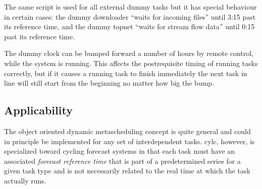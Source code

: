 The same script is used for all external dummy tasks but it has special
behaviour in certain cases: the dummy downloader ``waits for incoming
files'' until 3:15 past its reference time, and the dummy topnet ``waits
for stream flow data'' until 0:15 past its reference time.

The dummy clock can be bumped forward a number of hours by remote
control, while the system is running. This affects the postrequisite
timing of running tasks correctly, but if it causes a running task to
finish immediately the next task in line will still start from the
beginning no matter how big the bump.







\subsection{Applicability}

The object oriented dynamic metascheduling concept is quite general and
could in principle be implemented for any set of interdependent tasks.
cylc, however, is specialized toward cycling forecast systems in that
each task must have an associated {\em forecast reference time} that is
part of a predetermined series for a given task type and is not
necessarily related to the real time at which the task actually runs.  

